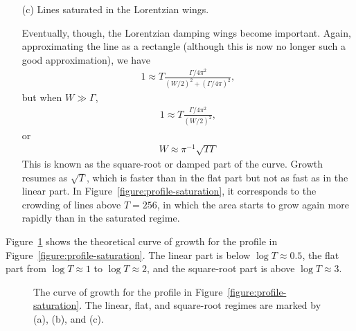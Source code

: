\begin{enumerate}
\newslide

\item[(c)] Lines saturated in the Lorentzian wings.

Eventually, though, the Lorentzian damping wings become important. Again, approximating the line as a rectangle (although this is now no longer such a good approximation), we have 
\begin{align}
1 \approx T
\frac{\Gamma / 4\pi^2}{(W/2)^2 +
(\Gamma/4\pi)^2},
\end{align}
but when $W \gg \Gamma$, 
\begin{align}
1 \approx T \frac{\Gamma / 4\pi^2}{(W/2)^2},
\end{align}
or
\begin{align}
W \approx \pi^{-1}\sqrt{T\Gamma}
\end{align}
This is known as the square-root or damped part of the
curve. Growth resumes as $\sqrt{T}$, which is faster than in the flat part but not as fast as in the linear part.  In Figure~\ref{figure:profile-saturation}, it corresponds to the crowding of lines above $T=256$, in which the area starts to grow again more rapidly than in the saturated regime.

\end{enumerate}

\newslide

Figure~\ref{figure:curve-of-growth} shows the theoretical curve of growth for the profile in Figure~\ref{figure:profile-saturation}. The linear part is below $\log T \approx 0.5$, the flat part from $\log T \approx 1$ to $\log T \approx 2$, and the square-root part is above $\log T \approx 3$.

\begin{figure}
\footnotesize
{}
\caption{The curve of growth for the profile in Figure~\ref{figure:profile-saturation}. The linear, flat, and square-root regimes are marked by (a), (b), and (c).}
\label{figure:curve-of-growth}
\end{figure}

